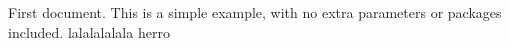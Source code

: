 \documentclass{article}
\begin{document}
First document. This is a simple example, with no 
extra parameters or packages included.
lalalalalala
herro
\end{document}
